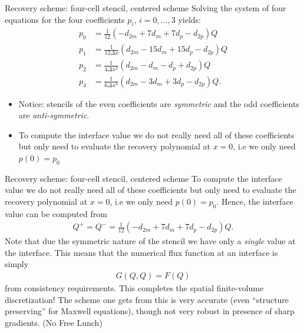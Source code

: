 \documentclass[aspectratio=169]{beamer}
\newcommand{\mypause}{}
\begin{document}
\begin{frame}{Recovery scheme: four-cell stencil, centered scheme}
  Solving the system of four equations for the four coefficients
  $p_i$, $i=0,\ldots,3$ yields:
  \begin{align*}
    p_0 &=  \frac{1}{12}(-d_{2m} + 7 d_m + 7 d_p - d_{2p}) Q \\
    p_1 &=  \frac{1}{12\Delta x}(d_{2m} - 15 d_m + 15 d_p - d_{2p}) Q \\
    p_2 &=  \frac{1}{4 \Delta x^2}(d_{2m} - d_m - d_p + d_{2p}) Q \\
    p_4 &=  \frac{1}{6 \Delta x^3}(d_{2m} - 3d_m + 3 d_p - d_{2p}) Q.
  \end{align*}
  \begin{itemize}
  \item Notice: stencils of the even coefficients are \emph{symmetric}
    and the odd coefficients are \emph{anti-symmetric}.%
    \mypause%
  \item To compute the interface value we do not really need all of
    these coefficients but only need to evaluate the recovery
    polynomial at $x=0$, i.e we only need $p(0) = p_0$
  \end{itemize}
\end{frame}

\begin{frame}{Recovery scheme: four-cell stencil, centered scheme}
  \small%
  To compute the interface value we do not really need all of these
  coefficients but only need to evaluate the recovery polynomial at
  $x=0$, i.e we only need $p(0) = p_0$. Hence, the interface value can
  be computed from
  \begin{align*}
    Q^+ = Q^- = \frac{1}{12}(-d_{2m} + 7 d_m + 7 d_p - d_{2p}) Q.
  \end{align*}
  Note that due the symmetric nature of the stencil we have only a
  \emph{single} value at the interface. This means that the numerical
  flux function at an interface is simply
  \begin{align*}
    G(Q,Q) = F(Q)
  \end{align*}
  from consistency requirements.%
  \mypause%
  This completes the spatial finite-volume discretization! The scheme
  one gets from this is very accurate (even ``structure preserving''
  for Maxwell equations), though not very robust in presence of sharp
  gradients. (No Free Lunch)
\end{frame}
\end{document}
